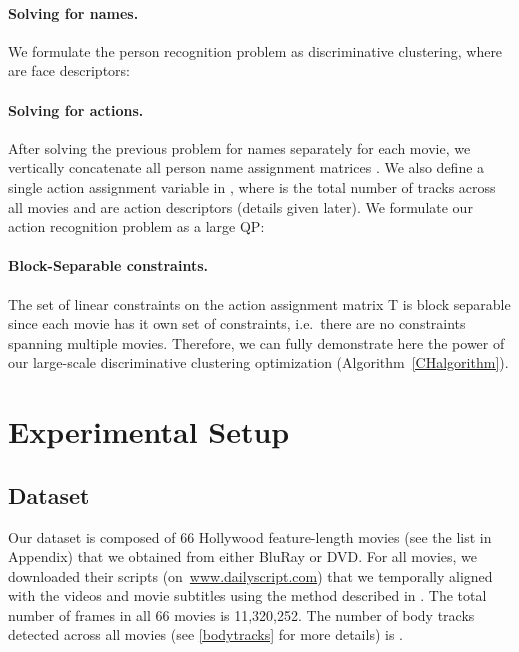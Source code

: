 \documentclass[10pt,twocolumn,letterpaper]{article}
\begin{document}
\paragraph{Solving for names.}
We formulate the person recognition problem as discriminative clustering, where  are face descriptors: 
\vspace{-.3cm}

\paragraph{Solving for actions.}
After solving the previous problem for names separately for each movie, we vertically concatenate all person name assignment matrices . We also define a single action assignment variable  in , where  is the total number of tracks across all movies and 
 are action descriptors (details given later). We formulate our action recognition problem as a large QP:


\paragraph{Block-Separable constraints.} The set of linear constraints on the action assignment matrix T is block separable since
each movie has it own set of constraints, i.e.\ there are no constraints spanning multiple movies. Therefore, we can fully demonstrate here the power of our large-scale discriminative clustering optimization (Algorithm~\ref{CHalgorithm}). 

 




\section{Experimental Setup}

\subsection{Dataset}
Our dataset is composed of 66 Hollywood feature-length movies (see the list in Appendix) that we obtained from either BluRay or DVD.
For all movies, we downloaded their scripts (on~\url{www.dailyscript.com})
that we temporally aligned with the videos and movie subtitles using the method described in \cite{laptev08learning}. The total number of frames in all 66 movies is 11,320,252. The number of body tracks detected across all movies (see \ref{bodytracks} for more details) is .
\end{document}
